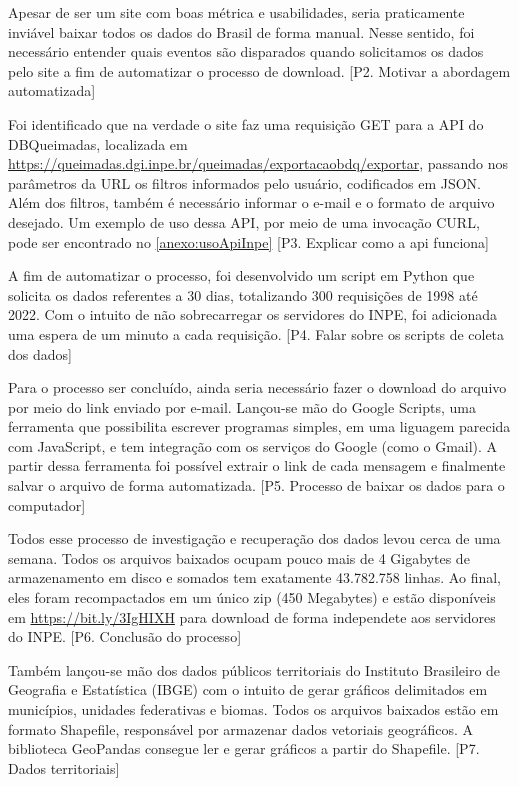 \documentclass[cic,tc]{iiufrgs}
\begin{document}
Apesar de ser um site com boas métrica e usabilidades, seria praticamente 
inviável baixar todos os dados do Brasil de forma manual. Nesse sentido, 
foi necessário entender quais eventos são disparados quando solicitamos 
os dados pelo site a fim de automatizar o processo de download. 
[P2. Motivar a abordagem automatizada] \par

Foi identificado que na verdade o site faz uma requisição GET para a API do 
DBQueimadas, localizada em 
\url{https://queimadas.dgi.inpe.br/queimadas/exportacaobdq/exportar}, 
passando nos parâmetros da URL os filtros informados pelo usuário, codificados 
em JSON. Além dos filtros, também é necessário informar o e-mail e o formato 
de arquivo desejado. Um exemplo de uso dessa API, por meio de uma invocação CURL, 
pode ser encontrado no \ref{anexo:usoApiInpe} [P3. Explicar como a api funciona]

A fim de automatizar o processo, foi desenvolvido um script em Python que 
solicita os dados referentes a 30 dias, totalizando 300 requisições de 1998 
até 2022. Com 
o intuito de não sobrecarregar os servidores do INPE, foi adicionada uma espera de 
um minuto a cada requisição. [P4. Falar sobre os scripts de coleta dos dados] \par

Para o processo ser concluído, ainda seria 
necessário fazer o download do arquivo por meio do link enviado por e-mail.
Lançou-se mão do Google Scripts, uma ferramenta que possibilita escrever 
programas simples, em uma liguagem parecida com JavaScript, e tem 
integração com os serviços do Google (como o Gmail). A partir dessa ferramenta
foi possível extrair o link de cada mensagem e finalmente salvar o arquivo
de forma automatizada. [P5. Processo de baixar os dados para o computador] \par

Todos esse processo de investigação e recuperação dos dados levou cerca de uma 
semana. Todos os arquivos baixados ocupam pouco mais de 4 Gigabytes de 
armazenamento em disco e somados tem exatamente 43.782.758 linhas. Ao final, eles 
foram recompactados em um único zip (450 Megabytes) e estão disponíveis 
em \url{https://bit.ly/3IgHIXH} para download de forma independete aos servidores 
do INPE. [P6. Conclusão do processo] \par

Também lançou-se mão dos dados públicos territoriais do Instituto Brasileiro de 
Geografia e Estatística (IBGE) com o intuito de gerar gráficos delimitados em 
municípios, unidades federativas e biomas. Todos os arquivos baixados estão em 
formato Shapefile, responsável por armazenar dados vetoriais geográficos. A 
biblioteca GeoPandas consegue ler e gerar gráficos a partir do Shapefile.
[P7. Dados territoriais] \par
\end{document}

